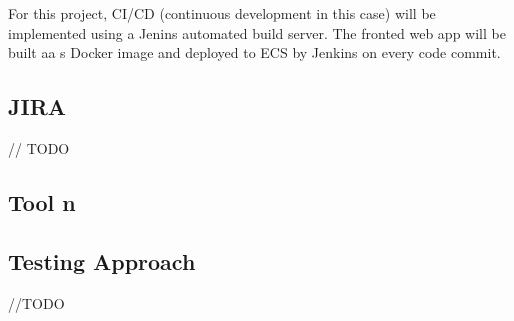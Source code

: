 	For this project, CI/CD (continuous development in this case) will be implemented using a Jenins automated build server. The fronted web app will be built aa s Docker image and deployed to ECS by Jenkins on every code commit.
	
	\subsection{JIRA}
	// TODO
	\subsection{Tool n}
	\subsection{Testing Approach}
	//TODO
